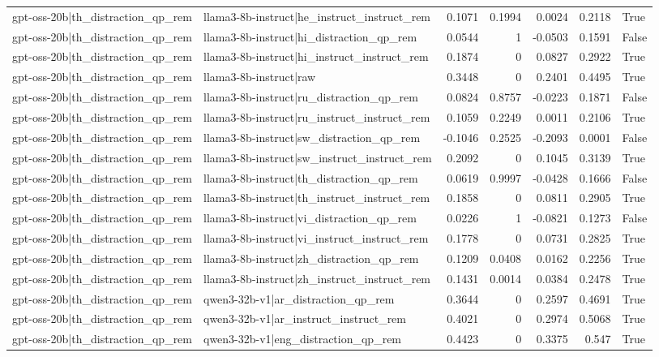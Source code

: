 \begin{table}
\begin{tabular}{l l r r r r l}
gpt-oss-20b|th_distraction_qp_rem & llama3-8b-instruct|he_instruct_instruct_rem & 0.1071 & 0.1994 & 0.0024 & 0.2118 & True \\
gpt-oss-20b|th_distraction_qp_rem & llama3-8b-instruct|hi_distraction_qp_rem & 0.0544 & 1 & -0.0503 & 0.1591 & False \\
gpt-oss-20b|th_distraction_qp_rem & llama3-8b-instruct|hi_instruct_instruct_rem & 0.1874 & 0 & 0.0827 & 0.2922 & True \\
gpt-oss-20b|th_distraction_qp_rem & llama3-8b-instruct|raw & 0.3448 & 0 & 0.2401 & 0.4495 & True \\
gpt-oss-20b|th_distraction_qp_rem & llama3-8b-instruct|ru_distraction_qp_rem & 0.0824 & 0.8757 & -0.0223 & 0.1871 & False \\
gpt-oss-20b|th_distraction_qp_rem & llama3-8b-instruct|ru_instruct_instruct_rem & 0.1059 & 0.2249 & 0.0011 & 0.2106 & True \\
gpt-oss-20b|th_distraction_qp_rem & llama3-8b-instruct|sw_distraction_qp_rem & -0.1046 & 0.2525 & -0.2093 & 0.0001 & False \\
gpt-oss-20b|th_distraction_qp_rem & llama3-8b-instruct|sw_instruct_instruct_rem & 0.2092 & 0 & 0.1045 & 0.3139 & True \\
gpt-oss-20b|th_distraction_qp_rem & llama3-8b-instruct|th_distraction_qp_rem & 0.0619 & 0.9997 & -0.0428 & 0.1666 & False \\
gpt-oss-20b|th_distraction_qp_rem & llama3-8b-instruct|th_instruct_instruct_rem & 0.1858 & 0 & 0.0811 & 0.2905 & True \\
gpt-oss-20b|th_distraction_qp_rem & llama3-8b-instruct|vi_distraction_qp_rem & 0.0226 & 1 & -0.0821 & 0.1273 & False \\
gpt-oss-20b|th_distraction_qp_rem & llama3-8b-instruct|vi_instruct_instruct_rem & 0.1778 & 0 & 0.0731 & 0.2825 & True \\
gpt-oss-20b|th_distraction_qp_rem & llama3-8b-instruct|zh_distraction_qp_rem & 0.1209 & 0.0408 & 0.0162 & 0.2256 & True \\
gpt-oss-20b|th_distraction_qp_rem & llama3-8b-instruct|zh_instruct_instruct_rem & 0.1431 & 0.0014 & 0.0384 & 0.2478 & True \\
gpt-oss-20b|th_distraction_qp_rem & qwen3-32b-v1|ar_distraction_qp_rem & 0.3644 & 0 & 0.2597 & 0.4691 & True \\
gpt-oss-20b|th_distraction_qp_rem & qwen3-32b-v1|ar_instruct_instruct_rem & 0.4021 & 0 & 0.2974 & 0.5068 & True \\
gpt-oss-20b|th_distraction_qp_rem & qwen3-32b-v1|eng_distraction_qp_rem & 0.4423 & 0 & 0.3375 & 0.547 & True \\

\end{tabular}
\end{table}
